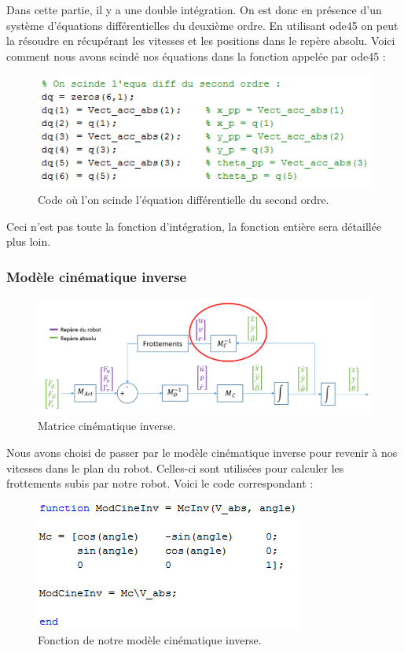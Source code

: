 \documentclass[a4paper,10pt]{article}
\begin{document}
Dans cette partie, il y a une double intégration. On est donc en présence d’un système d’équations différentielles du deuxième ordre. En utilisant ode45 on peut la résoudre en récupérant les vitesses et les positions dans le repère absolu. Voici comment nous avons scindé nos équations dans la fonction appelée par ode45 :

\begin{figure}[H]
\bigcenter\includegraphics[scale=0.8]{images/double_integration.png}
\caption{Code où l'on scinde l'équation différentielle du second ordre.}
\end{figure}

Ceci n’est pas toute la fonction d’intégration, la fonction entière sera détaillée plus loin.

\subsubsection{Modèle cinématique inverse}
\begin{figure}[H]
\bigcenter\includegraphics[scale=0.5]{images/modelecinematiqueinverse.png}
\caption{Matrice cinématique inverse.}
\end{figure}

Nous avons choisi de passer par le modèle cinématique inverse pour revenir à nos vitesses dans le plan du robot. Celles-ci sont utilisées pour calculer les frottements subis par notre robot. Voici le code correspondant :

\begin{figure}[H]
\bigcenter\includegraphics[scale=0.8]{images/cinematique_inverse.png}
\caption{Fonction de notre modèle cinématique inverse.}
\end{figure}
\end{document}
